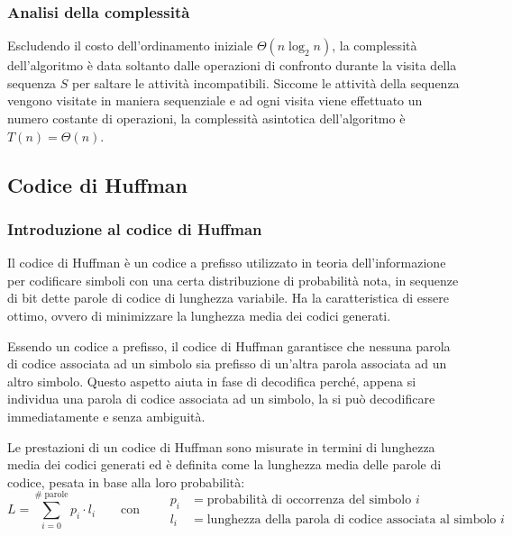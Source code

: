 \subsubsection*{Analisi della complessità}
Escludendo il costo dell'ordinamento iniziale \(\Theta(n \log_2 n)\), la complessità dell'algoritmo è data soltanto dalle
operazioni di confronto durante la visita della sequenza \(S\) per saltare le attività incompatibili. Siccome le attività
della sequenza vengono visitate in maniera sequenziale e ad ogni visita viene effettuato un numero costante di operazioni,
la complessità asintotica dell'algoritmo è \(T(n) = \Theta(n)\).

\newpage

\subsection{Codice di Huffman}
\subsubsection*{Introduzione al codice di Huffman}
Il codice di Huffman è un codice a prefisso utilizzato in teoria dell'informazione per codificare simboli con una certa
distribuzione di probabilità nota, in sequenze di bit dette parole di codice di lunghezza variabile. Ha la caratteristica
di essere ottimo, ovvero di minimizzare la lunghezza media dei codici generati.

Essendo un codice a prefisso, il codice di Huffman garantisce che nessuna parola di codice associata ad un simbolo sia
prefisso di un'altra parola associata ad un altro simbolo. Questo aspetto aiuta in fase di decodifica perché, appena si
individua una parola di codice associata ad un simbolo, la si può decodificare immediatamente e senza ambiguità.

Le prestazioni di un codice di Huffman sono misurate in termini di lunghezza media dei codici generati ed è definita come
la lunghezza media delle parole di codice, pesata in base alla loro probabilità:
\[L = \sum_{i=0}^{\# \; \text{parole}} p_i \cdot l_i \qquad \text{con} \qquad \begin{aligned}
	p_i & = \text{probabilità di occorrenza del simbolo } i \\[3pt]
	l_i & = \text{lunghezza della parola di codice associata al simbolo } i
\end{aligned}\]

